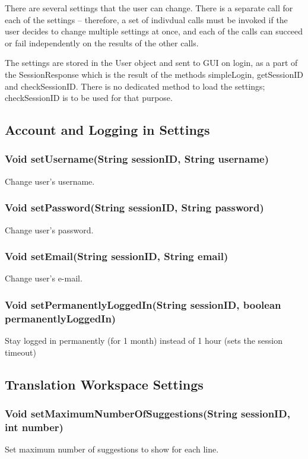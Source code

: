There are several settings that the user can change. There is a separate call for each of the settings -- therefore, a set of indivdual calls must be invoked if the user decides to change multiple settings at once, and each of the calls can succeed or fail independently on the results of the other calls.

The settings are stored in the User object and sent to GUI on login, as a part of the SessionResponse which is the result of the methods simpleLogin, getSessionID and checkSessionID. There is no dedicated method to load the settings; checkSessionID is to be used for that purpose.

\subsection{Account and Logging in Settings}

\subsubsection{Void setUsername(String sessionID, String username)}
Change user's username.

\subsubsection{Void setPassword(String sessionID, String password)}
Change user's password.

\subsubsection{Void setEmail(String sessionID, String email)}
Change user's e-mail.

\subsubsection{Void setPermanentlyLoggedIn(String sessionID, boolean permanentlyLoggedIn)}
Stay logged in permanently (for 1 month) instead of 1 hour (sets the session timeout)

\subsection{Translation Workspace Settings}

\subsubsection{Void setMaximumNumberOfSuggestions(String sessionID, int number)}
Set maximum number of suggestions to show for each line.

